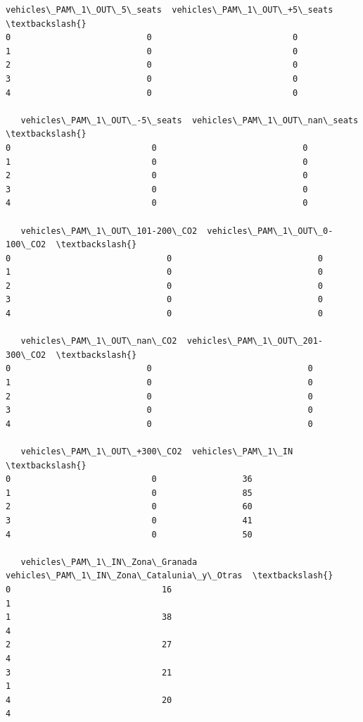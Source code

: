 \documentclass[11pt]{article}
\begin{document}
\begin{tcolorbox}[breakable, size=fbox, boxrule=.5pt, pad at break*=1mm, opacityfill=0]
\begin{Verbatim}[commandchars=\\\{\}]
   vehicles\_PAM\_1\_OUT\_5\_seats  vehicles\_PAM\_1\_OUT\_+5\_seats  \textbackslash{}
0                           0                            0
1                           0                            0
2                           0                            0
3                           0                            0
4                           0                            0

   vehicles\_PAM\_1\_OUT\_-5\_seats  vehicles\_PAM\_1\_OUT\_nan\_seats  \textbackslash{}
0                            0                             0
1                            0                             0
2                            0                             0
3                            0                             0
4                            0                             0

   vehicles\_PAM\_1\_OUT\_101-200\_CO2  vehicles\_PAM\_1\_OUT\_0-100\_CO2  \textbackslash{}
0                               0                             0
1                               0                             0
2                               0                             0
3                               0                             0
4                               0                             0

   vehicles\_PAM\_1\_OUT\_nan\_CO2  vehicles\_PAM\_1\_OUT\_201-300\_CO2  \textbackslash{}
0                           0                               0
1                           0                               0
2                           0                               0
3                           0                               0
4                           0                               0

   vehicles\_PAM\_1\_OUT\_+300\_CO2  vehicles\_PAM\_1\_IN  \textbackslash{}
0                            0                 36
1                            0                 85
2                            0                 60
3                            0                 41
4                            0                 50

   vehicles\_PAM\_1\_IN\_Zona\_Granada  vehicles\_PAM\_1\_IN\_Zona\_Catalunia\_y\_Otras  \textbackslash{}
0                              16                                         1
1                              38                                         4
2                              27                                         4
3                              21                                         1
4                              20                                         4


\end{Verbatim}
\end{tcolorbox}
\end{document}
